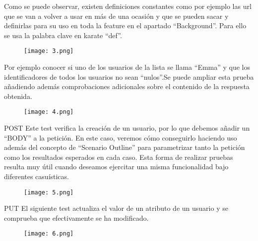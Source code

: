 \documentclass{article}
\begin{document}
Como se puede observar, existen definiciones constantes como por ejemplo las url que se van a volver a usar en más de una ocasión y que se pueden sacar y definirlas para su uso en toda la feature en el apartado “Background”. Para ello se usa la palabra clave en karate “def”.
\newline 
\begin{figure}[H]
\centering
\texttt{[image: 3.png]}
\caption{\label{fig:1}}
\end{figure}
Por ejemplo conocer si uno de los usuarios de la lista se llama “Emma” y que los identificadores de todos los usuarios no sean “nulos”.Se puede ampliar esta prueba añadiendo además comprobaciones adicionales sobre el contenido de la respuesta obtenida.
\newline
\begin{figure}[H]
\centering
\texttt{[image: 4.png]}
\caption{\label{fig:1}}
\end{figure}
\newline
\newline
POST
\newline
\newline
Este test verifica la creación de un usuario, por lo que debemos añadir un “BODY” a la petición. En este caso, veremos cómo conseguirlo haciendo uso además del concepto de “Scenario Outline” para parametrizar tanto la petición como los resultados esperados en cada caso.
\newline
\newline
Esta forma de realizar pruebas resulta muy útil cuando deseamos ejercitar una misma funcionalidad bajo diferentes casuísticas.
\begin{figure}[H]
\centering
\texttt{[image: 5.png]}
\caption{\label{fig:1}}
\end{figure}
\newline
\newline
PUT
\newline
\newline
El siguiente test actualiza el valor de un atributo de un usuario y se comprueba que efectivamente se ha modificado.
\newline
\begin{figure}[H]
\centering
\texttt{[image: 6.png]}
\caption{\label{fig:1}}
\end{figure}
\end{document}
